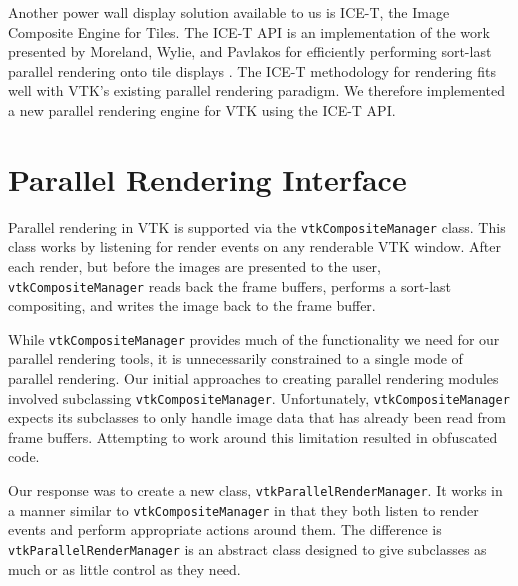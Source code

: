 \documentclass[twocolumn]{article}
\newcommand{\cidentifier}[1]{\texttt{#1}}
\begin{document}
  Another power wall display solution available to us is ICE-T, the Image
  Composite Engine for Tiles.  The ICE-T API is an implementation of the
  work presented by Moreland, Wylie, and Pavlakos for efficiently
  performing sort-last parallel rendering onto tile displays
  \cite{Moreland01}.  The ICE-T methodology for rendering fits well with
  VTK's existing parallel rendering paradigm.  We therefore implemented a
  new parallel rendering engine for VTK using the ICE-T API.


  \section{Parallel Rendering Interface}
  \label{sec:parallel_rendering_interface}

  Parallel rendering in VTK is supported via the
  \cidentifier{vtk\-Composite\-Manager} class.  This class works by
  listening for render events on any renderable VTK window.  After each
  render, but before the images are presented to the user,
  \cidentifier{vtk\-Composite\-Manager} reads back the frame buffers,
  performs a sort-last compositing, and writes the image back to the frame
  buffer.

  While \cidentifier{vtk\-Composite\-Manager} provides much of the
  functionality we need for our parallel rendering tools, it is
  unnecessarily constrained to a single mode of parallel rendering.  Our
  initial approaches to creating parallel rendering modules involved
  subclassing \cidentifier{vtk\-Composite\-Manager}.  Unfortunately,
  \cidentifier{vtk\-Composite\-Manager} expects its subclasses to only
  handle image data that has already been read from frame buffers.
  Attempting to work around this limitation resulted in obfuscated code.

  Our response was to create a new class,
  \cidentifier{vtk\-Parallel\-Render\-Manager}.  It works in a manner
  similar to \cidentifier{vtk\-Composite\-Manager} in that they both listen
  to render events and perform appropriate actions around them.  The
  difference is \cidentifier{vtk\-Parallel\-Render\-Manager} is an abstract
  class designed to give subclasses as much or as little control as they
  need.
\end{document}
